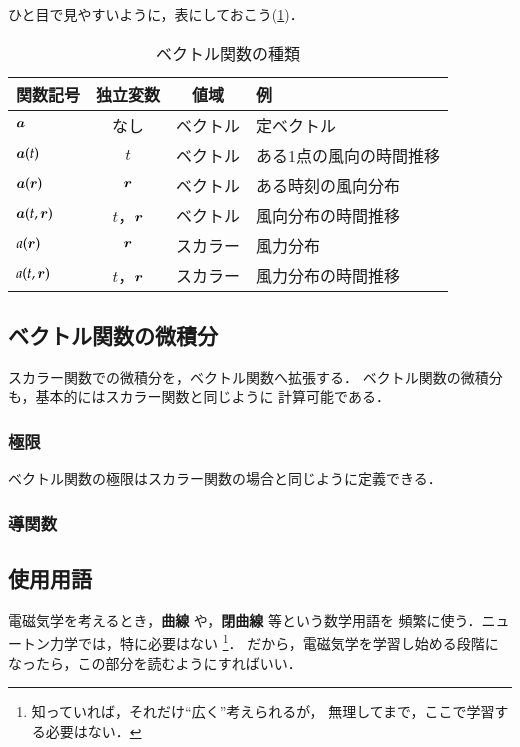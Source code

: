     ひと目で見やすいように，表にしておこう(\Table\ref{table:f4unit})．
        \begin{table}[htb]
          \centering
          \caption{ベクトル関数の種類}
          \begin{tabular}{|l|c|c|l|}                                        \hline
            関数記号      & 独立変数   & 値域     & 例                      \\ \hline  \hline
            $\boldsymbol{a}$         & なし       & ベクトル & 定ベクトル              \\ \hline
            $\boldsymbol{a}(t)$      & $t$        & ベクトル & ある1点の風向の時間推移 \\ \hline
            $\boldsymbol{a}(\boldsymbol{r})$    & $\boldsymbol{r}$      & ベクトル & ある時刻の風向分布      \\ \hline
            $\boldsymbol{a}(t, \boldsymbol{r})$ & $t$，$\boldsymbol{r}$ & ベクトル & 風向分布の時間推移      \\ \hline
            $a(\boldsymbol{r})$      & $\boldsymbol{r}$      & スカラー & 風力分布                \\ \hline
            $a(t, \boldsymbol{r})$   & $t$，$\boldsymbol{r}$ & スカラー & 風力分布の時間推移      \\ \hline
          \end{tabular}
          \label{table:f4unit}
        \end{table}

    \subsection{ベクトル関数の微積分}
    \begin{mycomment}
        スカラー関数での微積分を，ベクトル関数へ拡張する．
        ベクトル関数の微積分も，基本的にはスカラー関数と同じように
        計算可能である．
    \end{mycomment}

    \subsubsection{極限}
    ベクトル関数の極限はスカラー関数の場合と同じように定義できる．

    \subsubsection{導関数}

 \subsection{使用用語}
    電磁気学を考えるとき，\textbf{曲線} や，\textbf{閉曲線} 等という数学用語を
    頻繁に使う．ニュートン力学では，特に必要はない
        \footnote{
            知っていれば，それだけ“広く”考えられるが，
            無理してまで，ここで学習する必要はない．
        }．
    だから，電磁気学を学習し始める段階になったら，この部分を読むようにすればいい．

